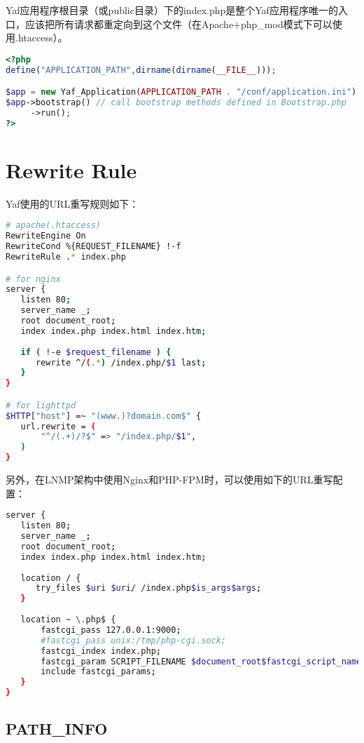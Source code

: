 Yaf应用程序根目录（或public目录）下的index.php是整个Yaf应用程序唯一的入口，应该把所有请求都重定向到这个文件（在Apache+php\_mod模式下可以使用.htaccess）。



\begin{lstlisting}[language=PHP]
<?php
define("APPLICATION_PATH",dirname(dirname(__FILE__)));

$app = new Yaf_Application(APPLICATION_PATH . "/conf/application.ini");
$app->bootstrap() // call bootstrap methods defined in Bootstrap.php
     ->run();
?>
\end{lstlisting}

\section{Rewrite Rule}


Yaf使用的URL重写规则如下：


\begin{lstlisting}[language=bash]
# apache(.htaccess)
RewriteEngine On
RewriteCond %{REQUEST_FILENAME} !-f
RewriteRule .* index.php

# for nginx
server {
   listen 80;
   server_name _;
   root document_root;
   index index.php index.html index.htm;
   
   if ( !-e $request_filename ) {
      rewrite ^/(.*) /index.php/$1 last;
   }
}

# for lighttpd
$HTTP["host"] =~ "(www.)?domain.com$" {
   url.rewrite = (
       "^/(.+)/?$" => "/index.php/$1",
   )
}
\end{lstlisting}

另外，在LNMP架构中使用Nginx和PHP-FPM时，可以使用如下的URL重写配置：

\begin{lstlisting}[language=bash]
server {
   listen 80;
   server_name _;
   root document_root;
   index index.php index.html index.htm;
   
   location / {
      try_files $uri $uri/ /index.php$is_args$args;
   }
   
   location ~ \.php$ {
       fastcgi_pass 127.0.0.1:9000;
       #fastcgi_pass unix:/tmp/php-cgi.sock;
       fastcgi_index index.php;
       fastcgi_param SCRIPT_FILENAME $document_root$fastcgi_script_name;
       include fastcgi_params;  
   }
}
\end{lstlisting}


\subsection{PATH\_INFO}

